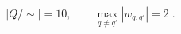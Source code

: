 \begin{equation}\label{eq:sync_kernel_10_state_mealy_minimality}
\boxed{\;|Q/\!\sim|=10,\qquad \max_{q\neq q'}|w_{q,q'}|=2\;}.
\end{equation}

